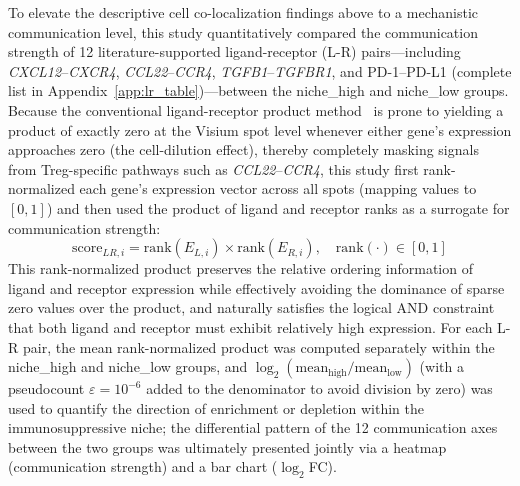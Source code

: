 \documentclass[12pt, a4paper]{article}
\begin{document}
To elevate the descriptive cell co-localization findings above to a mechanistic communication level, this study quantitatively compared the communication strength of 12 literature-supported ligand-receptor (L-R) pairs—including \textit{CXCL12}--\textit{CXCR4}, \textit{CCL22}--\textit{CCR4}, \textit{TGFB1}--\textit{TGFBR1}, and PD-1--PD-L1 (complete list in Appendix~\ref{app:lr_table})—between the niche\_high and niche\_low groups. Because the conventional ligand-receptor product method~\citep{efremova2020cellphonedb} is prone to yielding a product of exactly zero at the Visium spot level whenever either gene's expression approaches zero (the cell-dilution effect), thereby completely masking signals from Treg-specific pathways such as \textit{CCL22}--\textit{CCR4}, this study first rank-normalized each gene's expression vector across all spots (mapping values to $[0,1]$) and then used the product of ligand and receptor ranks as a surrogate for communication strength:
\begin{equation*}
\text{score}_{LR,i} = \text{rank}(E_{L,i}) \times \text{rank}(E_{R,i}), \quad \text{rank}(\cdot) \in [0,1]
\end{equation*}
This rank-normalized product preserves the relative ordering information of ligand and receptor expression while effectively avoiding the dominance of sparse zero values over the product, and naturally satisfies the logical AND constraint that both ligand and receptor must exhibit relatively high expression. For each L-R pair, the mean rank-normalized product was computed separately within the niche\_high and niche\_low groups, and $\log_2(\text{mean}_{\text{high}}/\text{mean}_{\text{low}})$ (with a pseudocount $\varepsilon = 10^{-6}$ added to the denominator to avoid division by zero) was used to quantify the direction of enrichment or depletion within the immunosuppressive niche; the differential pattern of the 12 communication axes between the two groups was ultimately presented jointly via a heatmap (communication strength) and a bar chart ($\log_2$FC).
\end{document}
